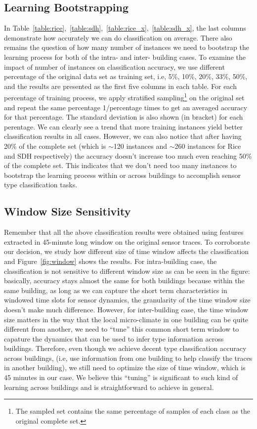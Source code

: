 \subsection{Learning Bootstrapping}
In Table~\ref{table:rice},~\ref{table:sdh},~\ref{table:rice_x},~\ref{table:sdh_x}, the last columns demonstrate how accurately we can do classification on average. There also remains the question of how many number of instances we need to bootstrap the learning process for both of the intra- and inter- building cases. To examine the impact of number of instances on classification accuracy, we use different percentage of the original data set as training set, i.e, 5\%, 10\%, 20\%, 33\%,
50\%, and the results are presented as the first five columns in each table. For each percentage of training process, we apply stratified sampling\footnote{The sampled set contains the same percentage of samples of each class as the original complete set.} on the original set and repeat the same percentage 1/percentage times to get an averaged accuracy for that percentage. The standard deviation is also shown (in bracket) for each perentage. We can clearly see a trend that more
training instances yield better classification results in all cases. However, we can also notice that after having 20\% of the complete set (which is $\sim$120 instances and $\sim$260 instances for Rice and SDH respectively) the accuracy doesn't increase too much even reaching 50\% of the complete set. This indicates that we don't need too many instances to bootstrap the learning process within or across buildings to accomplish sensor type classification tasks.

\subsection{Window Size Sensitivity}
Remember that all the above classification results were obtained using features extracted in 45-minute long window on the original sensor traces. To corroborate our decision, we study how different size of time window affects the classification and Figure~\ref{fig:window} shows the results. For intra-building case, the classification is not sensitive to different window size as can be seen in the figure: basically, accuracy stays almost the same for both buildings because within the same building, as long as we can capture the short term characteristics in windowed time slots for sensor dynamics, the granularity of the time window size doesn't make much difference. However, for inter-building case, the time window size matters in the way that the local micro-climate in one building can be quite different from another, we need to ``tune'' this common short term window to capature the dynamics that can be used to infer type information across buildings. Therefore, even though we achieve decent type classification accuracy across buildings, (i.e, use information from one building to help classify the traces in another building), we still need to optimize the size of time window, which is 45 minutes in our case. We believe this ``tuning'' is significant to such kind of learning across buildings and is straightforward to achieve in general.

